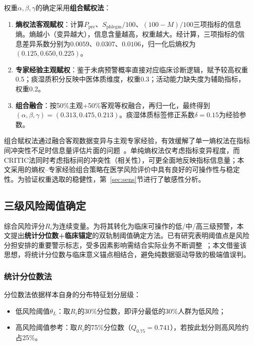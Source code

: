 \documentclass[a4paper,12pt]{ctexart}
\begin{document}
权重$\alpha,\beta,\gamma$的确定采用\textbf{组合赋权法}：
\begin{enumerate}
    \item \textbf{熵权法客观赋权}：计算$P_{\text{pre}}$、$S_{\text{phlegm}}/100$、$(100-M)/100$三项指标的信息熵。熵越小（变异越大），信息含量越高，权重越大。经计算，三项指标的信息差异系数分别为$0.0059$、$0.0307$、$0.0106$，归一化后熵权为$(0.125, 0.650, 0.225)$。
    \item \textbf{专家经验主观赋权}：鉴于未病预警概率直接对应临床诊断逻辑，赋予较高权重0.5；痰湿质积分反映中医体质维度，权重0.3；活动能力缺失度为辅助指标，权重0.2。
    \item \textbf{组合融合}：按50\%主观+50\%客观等权融合，再归一化，最终得到$(\alpha,\beta,\gamma)=(0.313, 0.475, 0.213)$。痰湿体质标签修正系数$\delta=0.15$为经验参数。
\end{enumerate}

组合赋权法通过融合客观数据变异与主观专家经验，有效缓解了单一熵权法在指标间冲突性不足时信息量评估片面的问题~\cite{jiang2021entropy}。单纯熵权法仅考虑指标变异程度，而CRITIC法同时考虑指标间的冲突性（相关性），可更全面地反映指标信息量；本文采用的熵权--专家经验组合策略在医学风险评价中具有良好的可操作性与稳定性。为验证权重选取的稳健性，第~\ref{sec:sens}节进行了敏感性分析。

\subsection{三级风险阈值确定}

综合风险评分$R_i$为连续变量。为将其转化为临床可操作的低/中/高三级预警，本文提出\textbf{统计分位数+临床锚定}的双轨制阈值确定方法。已有研究表明阈值点是风险分担安排的重要警示标志，受多因素影响需结合实际业务不断调整~\cite{yang2018risk}；本文借鉴该思想，将统计分位数与临床意义锚点相结合，避免纯数据驱动导致的极端值误判。

\subsubsection{统计分位数法}
分位数法依据样本自身的分布特征划分层级：
\begin{itemize}
    \item 低风险阈值$\theta_L$：取$R_i$的30\%分位数，即评分最低的30\%人群为低风险；
    \item 高风险阈值参考：取$R_i$的75\%分位数（$Q_{0.75}=0.741$），若按此划分则高风险约占25\%。
\end{itemize}
\end{document}
